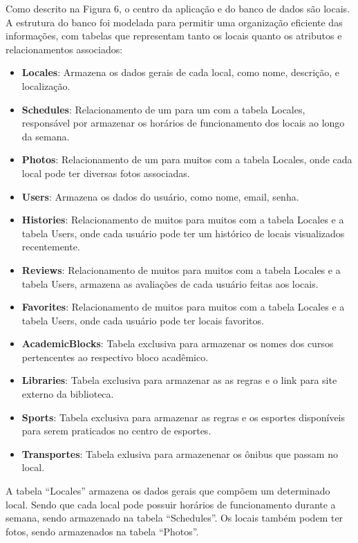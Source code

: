     Como descrito na Figura 6, o centro da aplicação e do banco de dados são locais. A estrutura do banco foi modelada para permitir uma organização eficiente das informações, com tabelas que representam tanto os locais quanto os atributos e relacionamentos associados:

    \begin{itemize}
        \item \textbf{Locales}: Armazena os dados gerais de cada local, como nome, descrição, e localização.
        \item \textbf{Schedules}: Relacionamento de um para um com a tabela Locales, responsável por armazenar os horários de funcionamento dos locais ao longo da semana.
        \item \textbf{Photos}: Relacionamento de um para muitos com a tabela Locales, onde cada local pode ter diversas fotos associadas.
        \item \textbf{Users}: Armazena os dados do usuário, como nome, email, senha.
        \item \textbf{Histories}: Relacionamento de muitos para muitos com a tabela Locales e a tabela Users, onde cada usuário pode ter um histórico de locais visualizados recentemente.
        \item \textbf{Reviews}: Relacionamento de muitos para muitos com a tabela Locales e a tabela Users, armazena as avaliações de cada usuário feitas aos locais.
        \item \textbf{Favorites}: Relacionamento de muitos para muitos com a tabela Locales e a tabela Users, onde cada usuário pode ter locais favoritos.
        \item \textbf{AcademicBlocks}: Tabela exclusiva para armazenar os nomes dos cursos pertencentes ao respectivo bloco acadêmico.
        \item \textbf{Libraries}: Tabela exclusiva para armazenar as as regras e o link para site externo da biblioteca.
        \item \textbf{Sports}: Tabela exclusiva para armazenar as regras e os esportes disponíveis para serem praticados no centro de esportes.
        \item \textbf{Transportes}: Tabela exlusiva para armazenenar os ônibus que passam no local.
    \end{itemize}

    A tabela ``Locales'' armazena os dados gerais que compõem um determinado local. Sendo que cada local pode possuir horários de funcionamento durante a semana, sendo armazenado na tabela ``Schedules''. Os locais também podem ter fotos, sendo armazenados na tabela ``Photos''.
    
